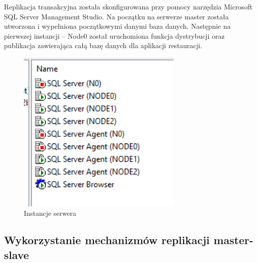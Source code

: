 \documentclass{article}
\begin{document}
	Replikacja transakcyjna została skonfigurowana przy pomocy narzędzia Microsoft SQL Server Management Studio. Na początku na serwerze master została utworzona i wypełniona początkowymi danymi baza danych. Następnie na pierwszej instancji – Node0 został uruchomiona funkcja dystrybucji oraz publikacja zawierająca całą bazę danych dla aplikacji restauracji.
	
	\begin{figure}[hbt!]
		\includegraphics[width=8cm]{Files/Pictures/instancje}
		\centering
		\caption{Instancje serwera}
	\end{figure}
	
	
	\newpage	
	\subsection{Wykorzystanie mechanizmów replikacji master-slave}
\end{document}

